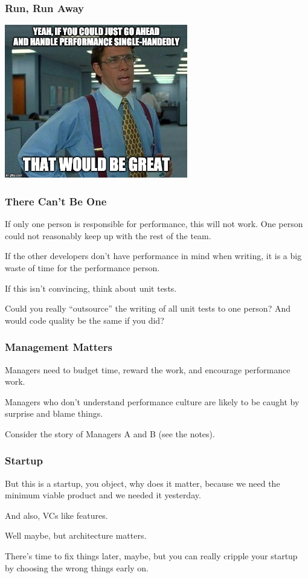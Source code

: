 \begin{frame}
\frametitle{Run, Run Away}

\begin{center}
	\includegraphics[width=0.6\textwidth]{images/wouldbegreat.jpg}
\end{center}

\end{frame}


\begin{frame}
\frametitle{There Can't Be One}

If only one person is responsible for performance, this will not work. One person could not reasonably keep up with the rest of the team. 

If the other developers don't have performance in mind when writing, it is a big waste of time for the performance person.

If this isn't convincing, think about unit tests. 

Could you really ``outsource'' the writing of all unit tests to one person? And would code quality be the same if you did?

\end{frame}



\begin{frame}
\frametitle{Management Matters}

Managers need to budget time, reward the work, and encourage performance work. 

Managers who don't understand performance culture are likely to be caught by surprise and blame things. 

Consider the story of Managers A and B (see the notes).

\end{frame}



\begin{frame}
\frametitle{Startup}


But this is a startup, you object, why does it matter, because we need the minimum viable product and we needed it yesterday.

And also, VCs like features. 

Well maybe, but architecture matters. 

There's time to fix things later, maybe, but you can really cripple your startup by choosing the wrong things early on. 

\end{frame}



